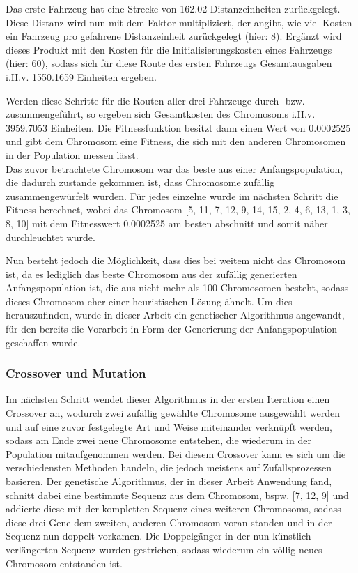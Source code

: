 \documentclass[a4paper,12pt,parskip,bibtotoc,liststotoc]{article}
\begin{document}
Das erste Fahrzeug hat eine Strecke von 162.02 Distanzeinheiten zurückgelegt.
Diese Distanz wird nun mit dem Faktor multipliziert, der angibt, wie viel Kosten ein Fahrzeug pro gefahrene Distanzeinheit zurückgelegt (hier: 8).
Ergänzt wird dieses Produkt mit den Kosten für die Initialisierungskosten eines Fahrzeugs (hier: 60), sodass sich für diese Route des ersten Fahrzeugs Gesamtausgaben i.H.v. 1550.1659 Einheiten ergeben.

Werden diese Schritte für die Routen aller drei Fahrzeuge durch- bzw. zusammengeführt, so ergeben sich Gesamtkosten des Chromosoms i.H.v. 3959.7053 Einheiten.
Die Fitnessfunktion besitzt dann einen Wert von 0.0002525 und gibt dem Chromosom eine Fitness, die sich mit den anderen Chromosomen in der Population messen lässt.\\

Das zuvor betrachtete Chromosom war das beste aus einer Anfangspopulation, die dadurch zustande gekommen ist, dass Chromosome zufällig zusammengewürfelt wurden.
Für jedes einzelne wurde im nächsten Schritt die Fitness berechnet, wobei das Chromosom [5, 11, 7, 12, 9, 14, 15, 2, 4, 6, 13, 1, 3, 8, 10] mit dem Fitnesswert 0.0002525 am besten abschnitt und somit näher durchleuchtet wurde.

Nun besteht jedoch die Möglichkeit, dass dies bei weitem nicht das Chromosom ist, da es lediglich das beste Chromosom aus der zufällig generierten Anfangspopulation ist, die aus nicht mehr als 100 Chromosomen besteht, sodass dieses Chromosom eher einer heuristischen Lösung ähnelt.
Um dies herauszufinden, wurde in dieser Arbeit ein genetischer Algorithmus angewandt, für den bereits die Vorarbeit in Form der Generierung der Anfangspopulation geschaffen wurde.

\subsubsection{Crossover und Mutation}

Im nächsten Schritt wendet dieser Algorithmus in der ersten Iteration einen Crossover an, wodurch zwei zufällig gewählte Chromosome ausgewählt werden und auf eine zuvor festgelegte Art und Weise miteinander verknüpft werden, sodass am Ende zwei neue Chromosome entstehen, die wiederum in der Population mitaufgenommen werden.
Bei diesem Crossover kann es sich um die verschiedensten Methoden handeln, die jedoch meistens auf Zufallsprozessen basieren.
Der genetische Algorithmus, der in dieser Arbeit Anwendung fand, schnitt dabei eine bestimmte Sequenz aus dem Chromosom, bspw. [7, 12, 9] und addierte diese mit der kompletten Sequenz eines weiteren Chromosoms, sodass diese drei Gene dem zweiten, anderen Chromosom voran standen und in der Sequenz nun doppelt vorkamen. 
Die Doppelgänger in der nun künstlich verlängerten Sequenz wurden gestrichen, sodass wiederum ein völlig neues Chromosom entstanden ist.
\end{document}

